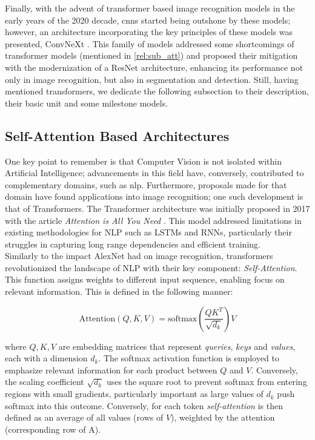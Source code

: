 \noindent Finally, with the advent of transformer based image recognition models in the early years of the 
2020 decade, \glspl{cnn} started being outshone by these models; however, an architecture 
incorporating the key principles of these models was presented, ConvNeXt \autocite{liu2022convnet}.
This family of models addressed some shortcomings of transformer models (mentioned in 
\autoref{rel:sub_att}) and proposed their mitigation with the modernization of a ResNet 
architecture, enhancing its performance not only in image recognition, but also in segmentation and 
detection. Still, having mentioned transformers, we dedicate the following subsection to their 
description, their basic unit and some milestone models.


\subsection{Self-Attention Based Architectures}
\label{rel:sub_att}
One key point to remember is that Computer Vision is not isolated within Artificial 
Intelligence; advancements in this field have, conversely, contributed to complementary domains, 
such as \gls{nlp}. Furthermore, proposals made for that domain have found applications into image 
recognition; one such development is that of Transformers. The Transformer architecture was 
initially proposed in 2017 with the article \emph{Attention is All You Need} 
\autocite{vaswani2017attention}. This model addressed limitations in existing methodologies for 
NLP such as LSTMs and RNNs, particularly their struggles in capturing long range dependencies 
and efficient training.\\

\noindent Similarly to the impact AlexNet had on image recognition, transformers 
revolutionized the landscape of NLP with their key component: \emph{Self-Attention}. This function 
assigns weights to different input sequence, enabling focus on relevant information. 
This is defined in the following manner:

\begin{equation}
    \mbox{Attention}(Q, K, V) = \mbox{softmax}\left(\frac{QK^T}{\sqrt{d_k}}\right) V
    \label{eq:att}
\end{equation}

\noindent where $Q, K, V$ are embedding matrices that represent \emph{queries}, \emph{keys} and 
\emph{values}, each with a dimension $d_k$. The softmax activation function is employed to 
emphasize relevant information for each product between $Q$ and $V$. Conversely, the scaling 
coefficient $\sqrt{d_k}$ uses the square root to prevent softmax from entering regions with small 
gradients, particularly important as large values of $d_k$ push softmax into this outcome. 
Conversely, for each token \emph{self-attention} is then defined as an average of all values 
(rows of $V$), weighted by the attention (corresponding row of A).

